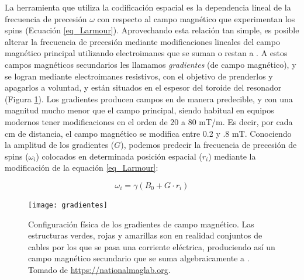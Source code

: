 La herramienta que utiliza la codificación espacial es la dependencia lineal de la frecuencia de precesión $\omega$ con respecto al campo magnético \Bzero que experimentan los spins (Ecuación \ref{eq_Larmour}). Aprovechando esta relación tan simple, es posible alterar la frecuencia de precesión mediante modificaciones lineales del campo magnético principal utilizando electroimanes que se suman o restan a \Bzero. A estos campos magnéticos secundarios les llamamos  \emph{gradientes} (de campo magnético), y se logran mediante electroimanes resistivos, con el objetivo de prenderlos y apagarlos a voluntad, y están situados en el espesor del toroide del resonador (Figura \ref{fig:gradientes}).  Los gradientes producen campos en \Bzero de manera predecible, y con una magnitud mucho menor que el campo principal, siendo habitual en equipos modernos tener modificaciones en el orden de 20 a 80 mT/m. Es decir, por cada cm de distancia, el campo magnético se modifica entre 0.2 y .8 mT. Conociendo la amplitud de los gradientes ($G$), podemos predecir la frecuencia de precesión de spins ($\omega_i$) colocados en determinada posición espacial ($r_i$) mediante la modificación de la equación \ref{eq_Larmour}:

\begin{equation}
 \omega_i = \gamma(B_0 + G \cdot r_i)
 \label{eq_LarmorGradientes}
\end{equation}




\begin{figure}[htb]
 \begin{figg}
   \texttt{[image: gradientes]}
   \caption{Configuración física de los gradientes de campo magnético. Las estructuras verdes, rojas y amarillas son en realidad conjuntos de cables por los que se pasa una corriente eléctrica, produciendo así un campo magnético secundario que se suma algebraicamente a \Bzero. Tomado de \url{https://nationalmaglab.org}.}
 \label{fig:gradientes}
 \end{figg}
\end{figure}




